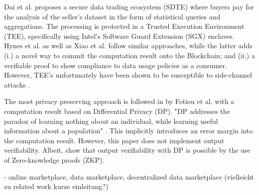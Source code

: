 Dai et al. proposes a secure data trading ecosystem (SDTE) \cite{daiSDTESecureBlockchainBased2020} where buyers pay for the analysis of the seller’s dataset in the form of statistical queries and aggregations. The processing is protected in a Trusted Execution Environment (TEE), specifically using Intel’s Software Guard Extension (SGX) enclaves. %
Hynes et al. \cite{hynesDemonstrationSterlingPrivacypreserving2018a} as well as Xiao et al. \cite{xiaoPrivacyGuardEnforcingPrivate2020} follow similar approaches, while the latter adds (i.) a novel way to commit the computation result onto the Blockchain; and (ii.) a verifiable proof to show compliance to data usage policies as a consumer. However, TEE's unfortunately have been shown to be susceptible to side-channel attacks \cite{brasserSoftwareGrandExposure,biondoGuardDilemmaEfficient}.

The most privacy preserving approach is followed in \cite{fotiouPrivacypreservingStatisticsMarketplace2021} by Fotiou et al. with a computation result based on Differential Privacy (DP). "DP addresses the paradox of learning nothing about an individual, while learning useful information about a population" \cite{tsaloliDifferentialPrivacyMeets}. This implicitly introduces an error margin into the computation result. However, this paper does not implement output verifiability. Albeit, \cite{narayanVerifiableDifferentialPrivacy2015,tsaloliDifferentialPrivacyMeets,koutsosAgoraPrivacyAwareData} show that output verifiability with DP is possible by the use of Zero-knowledge proofs (ZKP).

- online marketplace, data marketplace, decentralized data marketplace (vielleicht zu related work kurze einleitung?)